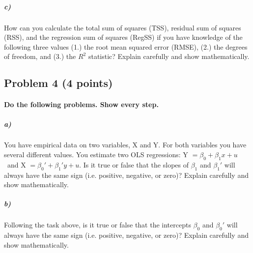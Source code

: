 \documentclass[12pt]{article}
\begin{document}
\subparagraph{c)} How can you calculate the total sum of squares (TSS), residual sum of squares (RSS), and the regression sum of squares (RegSS) if you have knowledge of the following three values (1.) the root mean squared error (RMSE), (2.) the degrees of freedom, and (3.) the $R^2$ statistic? Explain carefully and show mathematically.



\subsection*{Problem 4 (4 points)}

\paragraph{Do the following problems. Show every step.}

\subparagraph{a)} You have empirical data on two variables, X and Y. For both variables you have several different values. You estimate two OLS regressions: Y $= \beta_0 + \beta_1 x + u$ \ and X $= \beta_0' + \beta_1' y + u$. Is it true or false that the slopes of $\beta_1$ and $\beta_1'$ will always have the same sign (i.e. positive, negative, or zero)? Explain carefully and show mathematically.

\subparagraph{b)} Following the task above, is it true or false that the intercepts $\beta_0$ and $\beta_0'$ will always have the same sign (i.e. positive, negative, or zero)? Explain carefully and show mathematically.
\end{document}
